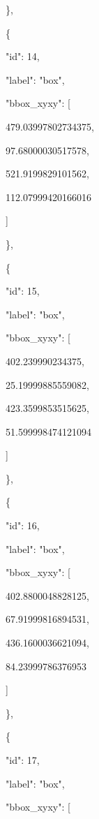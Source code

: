 \documentclass[10pt,a4paper]{article}
\begin{document}
    \},\allowbreak{}\par
    \{\par
      "id":\allowbreak{} 14,\allowbreak{}\par
      "label":\allowbreak{} "box",\allowbreak{}\par
      "bbox\_xyxy":\allowbreak{} [\par
        479.03997802734375,\allowbreak{}\par
        97.68000030517578,\allowbreak{}\par
        521.9199829101562,\allowbreak{}\par
        112.07999420166016\par
      ]\par
    \},\allowbreak{}\par
    \{\par
      "id":\allowbreak{} 15,\allowbreak{}\par
      "label":\allowbreak{} "box",\allowbreak{}\par
      "bbox\_xyxy":\allowbreak{} [\par
        402.239990234375,\allowbreak{}\par
        25.19999885559082,\allowbreak{}\par
        423.3599853515625,\allowbreak{}\par
        51.599998474121094\par
      ]\par
    \},\allowbreak{}\par
    \{\par
      "id":\allowbreak{} 16,\allowbreak{}\par
      "label":\allowbreak{} "box",\allowbreak{}\par
      "bbox\_xyxy":\allowbreak{} [\par
        402.8800048828125,\allowbreak{}\par
        67.91999816894531,\allowbreak{}\par
        436.1600036621094,\allowbreak{}\par
        84.23999786376953\par
      ]\par
    \},\allowbreak{}\par
    \{\par
      "id":\allowbreak{} 17,\allowbreak{}\par
      "label":\allowbreak{} "box",\allowbreak{}\par
      "bbox\_xyxy":\allowbreak{} [\par
\end{document}
